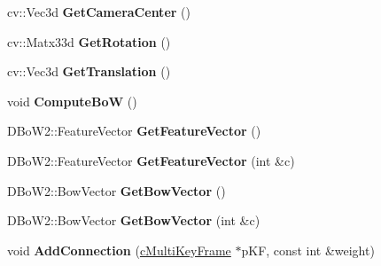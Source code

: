 \begin{DoxyCompactItemize}
\item 
cv\+::\+Vec3d {\bfseries Get\+Camera\+Center} ()\hypertarget{classMultiColSLAM_1_1cMultiKeyFrame_a52d0d5f776be032f4363bc8904bb4594}{}\label{classMultiColSLAM_1_1cMultiKeyFrame_a52d0d5f776be032f4363bc8904bb4594}

\item 
cv\+::\+Matx33d {\bfseries Get\+Rotation} ()\hypertarget{classMultiColSLAM_1_1cMultiKeyFrame_adcc8c83719bc45befd9a251354754b38}{}\label{classMultiColSLAM_1_1cMultiKeyFrame_adcc8c83719bc45befd9a251354754b38}

\item 
cv\+::\+Vec3d {\bfseries Get\+Translation} ()\hypertarget{classMultiColSLAM_1_1cMultiKeyFrame_a054bb1cbe785a223e5863a870740c71a}{}\label{classMultiColSLAM_1_1cMultiKeyFrame_a054bb1cbe785a223e5863a870740c71a}

\item 
void {\bfseries Compute\+BoW} ()\hypertarget{classMultiColSLAM_1_1cMultiKeyFrame_ac40cf01918bc7c73ec7224738a6c3dc2}{}\label{classMultiColSLAM_1_1cMultiKeyFrame_ac40cf01918bc7c73ec7224738a6c3dc2}

\item 
D\+Bo\+W2\+::\+Feature\+Vector {\bfseries Get\+Feature\+Vector} ()\hypertarget{classMultiColSLAM_1_1cMultiKeyFrame_a359c5ec6b8c05747bab0fd822471b157}{}\label{classMultiColSLAM_1_1cMultiKeyFrame_a359c5ec6b8c05747bab0fd822471b157}

\item 
D\+Bo\+W2\+::\+Feature\+Vector {\bfseries Get\+Feature\+Vector} (int \&c)\hypertarget{classMultiColSLAM_1_1cMultiKeyFrame_a535b2e313e46140841cc427f9257626a}{}\label{classMultiColSLAM_1_1cMultiKeyFrame_a535b2e313e46140841cc427f9257626a}

\item 
D\+Bo\+W2\+::\+Bow\+Vector {\bfseries Get\+Bow\+Vector} ()\hypertarget{classMultiColSLAM_1_1cMultiKeyFrame_aaaded0e46bd0f80977dbf4b7eda9c83b}{}\label{classMultiColSLAM_1_1cMultiKeyFrame_aaaded0e46bd0f80977dbf4b7eda9c83b}

\item 
D\+Bo\+W2\+::\+Bow\+Vector {\bfseries Get\+Bow\+Vector} (int \&c)\hypertarget{classMultiColSLAM_1_1cMultiKeyFrame_a9bb17488bc5f12615af67cb30d7db5a3}{}\label{classMultiColSLAM_1_1cMultiKeyFrame_a9bb17488bc5f12615af67cb30d7db5a3}

\item 
void {\bfseries Add\+Connection} (\hyperlink{classMultiColSLAM_1_1cMultiKeyFrame}{c\+Multi\+Key\+Frame} $\ast$p\+KF, const int \&weight)\hypertarget{classMultiColSLAM_1_1cMultiKeyFrame_a050437956340e21914b3dbea3f5fbb86}{}\label{classMultiColSLAM_1_1cMultiKeyFrame_a050437956340e21914b3dbea3f5fbb86}


\end{DoxyCompactItemize}
